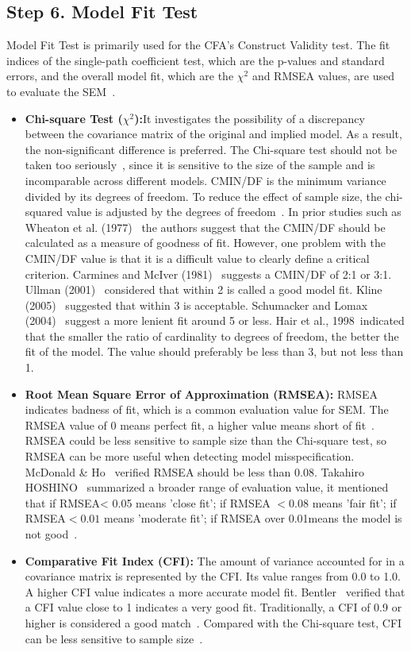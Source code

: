 \subsection{Step 6. Model Fit Test}
\label{step6}
Model Fit Test is primarily used for the CFA's Construct Validity test. The fit indices of the single-path coefficient test, which are the p-values and standard errors, and the overall model fit, which are the $\chi^2$ and RMSEA values, are used to evaluate the SEM~\cite{ref16}.

\begin{itemize}
\item \textbf{Chi-square Test ($\chi^2$):}It investigates the possibility of a discrepancy between the covariance matrix of the original and implied model. As a result, the non-significant difference is preferred. The Chi-square test should not be taken too seriously~\cite{ref22,ref23,ref24}, since it is sensitive to the size of the sample and is incomparable across different models. CMIN/DF is the minimum variance divided by its degrees of freedom. To reduce the effect of sample size, the chi-squared value is adjusted by the degrees of freedom~\cite{ref41}. In prior studies such as Wheaton et al. (1977)~\cite{ref24} the authors suggest that the CMIN/DF should be calculated as a measure of goodness of fit. However, one problem with the CMIN/DF value is that it is a difficult value to clearly define a critical criterion. Carmines and McIver (1981)~\cite{ref36} suggests a CMIN/DF of 2:1 or 3:1. Ullman (2001)~\cite{ref37} considered that within 2 is called a good model fit. Kline (2005)~\cite{ref38} suggested that within 3 is acceptable. Schumacker and Lomax (2004)~\cite{ref39} suggest a more lenient fit around 5 or less. Hair et al., 1998~\cite{ref40}indicated that the smaller the ratio of cardinality to degrees of freedom, the better the fit of the model. The value should preferably be less than 3, but not less than 1.
\item \textbf{Root Mean Square Error of Approximation (RMSEA):}  RMSEA indicates badness of fit, which is a common evaluation value for SEM. The RMSEA value of 0 means perfect fit, a higher value means short of fit~\cite{ref25}. RMSEA could be less sensitive to sample size than the Chi-square test, so RMSEA can be more useful when detecting model misspecification. McDonald \& Ho~\cite{ref2} verified RMSEA should be less than 0.08. Takahiro HOSHINO~\cite{SEMres} summarized a broader range of evaluation value, it mentioned that if RMSEA< 0.05 means 'close fit'; if RMSEA $< 0.08$ means 'fair fit'; if RMSEA$< 0.01$ means 'moderate fit'; if RMSEA over 0.01means the model is not good~\cite{ref3,ref4,ref5}. 
\item \textbf{Comparative Fit Index (CFI):} The amount of variance accounted for in a covariance matrix is represented by the CFI. Its value ranges from 0.0 to 1.0. A higher CFI value indicates a more accurate model fit. Bentler~\cite{ref6} verified that a CFI value close to 1 indicates a very good fit. Traditionally, a CFI of 0.9 or higher is considered a good match~\cite{ref43,ref44}. Compared with the Chi-square test, CFI can be less sensitive to sample size~\cite{ref26}.
\end{itemize}

